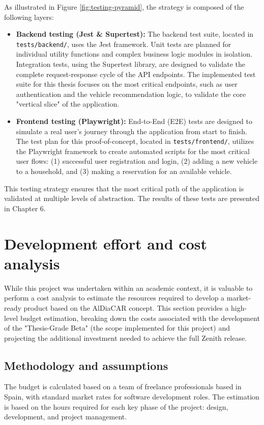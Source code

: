 As illustrated in Figure \ref{fig:testing-pyramid}, the strategy is composed of the following layers:
\begin{itemize}
    \item \textbf{Backend testing (Jest \& Supertest):} The backend test suite, located in \texttt{tests/backend/}, uses the Jest framework. Unit tests are planned for individual utility functions and complex business logic modules in isolation. Integration tests, using the Supertest library, are designed to validate the complete request-response cycle of the API endpoints. The implemented test suite for this thesis focuses on the most critical endpoints, such as user authentication and the vehicle recommendation logic, to validate the core "vertical slice" of the application.
    \textgap
    \item \textbf{Frontend testing (Playwright):} End-to-End (E2E) tests are designed to simulate a real user's journey through the application from start to finish. The test plan for this proof-of-concept, located in \texttt{tests/frontend/}, utilizes the Playwright framework to create automated scripts for the most critical user flows: (1) successful user registration and login, (2) adding a new vehicle to a household, and (3) making a reservation for an available vehicle.
\end{itemize}
This testing strategy ensures that the most critical path of the application is validated at multiple levels of abstraction. The results of these tests are presented in Chapter 6.

\section{Development effort and cost analysis}

While this project was undertaken within an academic context, it is valuable to perform a cost analysis to estimate the resources required to develop a market-ready product based on the AlDiaCAR concept. This section provides a high-level budget estimation, breaking down the costs associated with the development of the "Thesis-Grade Beta" (the scope implemented for this project) and projecting the additional investment needed to achieve the full Zenith release.

\subsection{Methodology and assumptions}

The budget is calculated based on a team of freelance professionals based in Spain, with standard market rates for software development roles. The estimation is based on the hours required for each key phase of the project: design, development, and project management.

